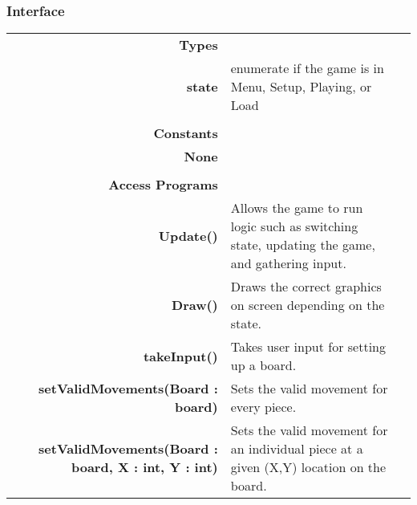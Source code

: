 \documentclass[10pt]{article}
\begin{document}
    \subsubsection{Interface}
        \begin{tabularx}{\linewidth}{@{} >{\bfseries}r Xp{5cm} }
            Types           & \begin{tabular}[t]{@{} l p{8cm}} 
                                     & \\
                                    state & enumerate if the game is in Menu, Setup, Playing, or Load \\
                              \end{tabular} \\
                              
            Constants       & \begin{tabular}[t]{@{} l p{8cm}} 
                                     & \\
                                    None & \\
                              \end{tabular} \\

            Access Programs & \begin{tabular}[t]{@{} p{4cm} p{8cm}}
                                     & \\
                                    Update() & Allows the game to run logic such as switching state, updating the game, and gathering input. \\
                                    Draw() & Draws the correct graphics on screen depending on the state. \\ 
                                    takeInput() & Takes user input for setting up a board. \\
                                    setValidMovements(Board : board) & Sets the valid movement for every piece. \\
                                    setValidMovements(Board : board, X : int, Y : int) & Sets the valid movement for an individual piece at a given (X,Y) location on the board. 
                              \end{tabular}
        \end{tabularx}
        
\end{document}

